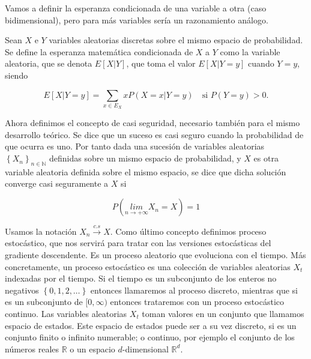 Vamos a definir la esperanza condicionada de una variable a otra (caso bidimensional), pero para más variables sería un razonamiento análogo.

\begin{definicion}
	Sean $X$ e $Y$ variables aleatorias discretas sobre el mismo espacio de probabilidad. Se define la esperanza matemática condicionada de $X$ a $Y$ como la variable aleatoria, que se denota $E[X|Y]$, que toma el valor $E[X|Y=y]$ cuando $Y=y$, siendo 

\begin{equation}
	E[X|Y=y] = \sum_{x \in E_X} xP(X=x | Y=y) \quad \text{si } P(Y=y)>0.
\end{equation}
\end{definicion}

Ahora definimos el concepto de casi seguridad, necesario también para el mismo desarrollo teórico. Se dice que un suceso es casi seguro cuando la probabilidad de que ocurra es uno. Por tanto dada una sucesión de variables aleatorias $\left \{ X_n \right \} _{n \in \mathbb{N}}$ definidas sobre un mismo espacio de probabilidad, y $X$ es otra variable aleatoria definida sobre el mismo espacio, se dice que dicha solución converge casi seguramente a $X$ si 

\begin{equation*}
	P \left ( \underset{n \rightarrow + \infty}{lim} X_n =X \right ) =1
\end{equation*}

Usamos la notación $X_n \overset{c.s}{\rightarrow} X$. Como último concepto definimos proceso estocástico, que nos servirá para tratar con las versiones estocásticas del gradiente descendente. Es un proceso aleatorio que evoluciona con el tiempo. Más concretamente, un proceso estocástico es una colección de variables aleatorias $X_t$ indexadas por el tiempo. Si el tiempo es un subconjunto de los enteros no negativos $\left \{ 0,1,2, \ldots \right \}$ entonces llamaremos al proceso discreto, mientras que si es un subconjunto de $[0, \infty )$ entonces trataremos con un proceso estocástico continuo. Las variables aleatorias $X_t$ toman valores en un conjunto que llamamos espacio de estados. Este espacio de estados puede ser a su vez discreto, si es un conjunto finito o infinito numerable; o continuo, por ejemplo el conjunto de los números reales $\mathbb{R}$ o un espacio $d$-dimensional $\mathbb{R}^d$.
